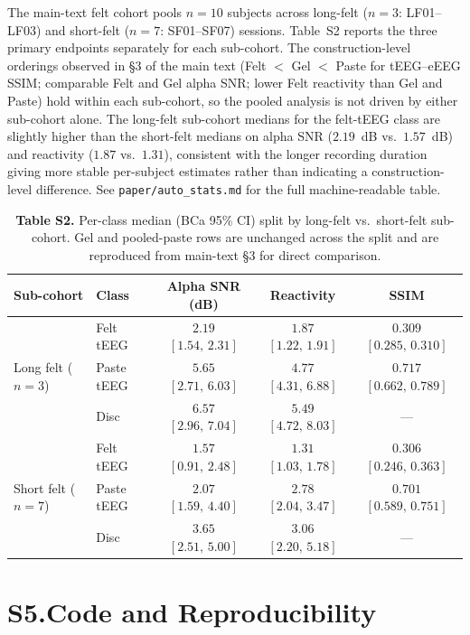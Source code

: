 \documentclass[10pt,a4paper]{article}
\begin{document}
The main-text felt cohort pools $n=10$ subjects across long-felt ($n=3$: LF01--LF03) and short-felt ($n=7$: SF01--SF07) sessions. Table~S2 reports the three primary endpoints separately for each sub-cohort. The construction-level orderings observed in §3 of the main text (Felt $<$ Gel $<$ Paste for tEEG--eEEG SSIM; comparable Felt and Gel alpha SNR; lower Felt reactivity than Gel and Paste) hold within each sub-cohort, so the pooled analysis is not driven by either sub-cohort alone. The long-felt sub-cohort medians for the felt-tEEG class are slightly higher than the short-felt medians on alpha SNR ($2.19$~dB vs.\ $1.57$~dB) and reactivity ($1.87$ vs.\ $1.31$), consistent with the longer recording duration giving more stable per-subject estimates rather than indicating a construction-level difference. See \texttt{paper/auto\_stats.md} for the full machine-readable table.

\begin{table}[H]
\caption*{\textbf{Table S2.} Per-class median (BCa 95\% CI) split by long-felt vs.\ short-felt sub-cohort. Gel and pooled-paste rows are unchanged across the split and are reproduced from main-text §3 for direct comparison.}
\centering\small
\begin{tabular}{llccc}
\toprule
\textbf{Sub-cohort} & \textbf{Class} & \textbf{Alpha SNR (dB)} & \textbf{Reactivity} & \textbf{SSIM} \\
\midrule
\multirow{3}{*}{Long felt ($n=3$)}
  & Felt tEEG  & $2.19$ $[1.54,\,2.31]$ & $1.87$ $[1.22,\,1.91]$ & $0.309$ $[0.285,\,0.310]$ \\
  & Paste tEEG & $5.65$ $[2.71,\,6.03]$ & $4.77$ $[4.31,\,6.88]$ & $0.717$ $[0.662,\,0.789]$ \\
  & Disc       & $6.57$ $[2.96,\,7.04]$ & $5.49$ $[4.72,\,8.03]$ & ---                       \\
\midrule
\multirow{3}{*}{Short felt ($n=7$)}
  & Felt tEEG  & $1.57$ $[0.91,\,2.48]$ & $1.31$ $[1.03,\,1.78]$ & $0.306$ $[0.246,\,0.363]$ \\
  & Paste tEEG & $2.07$ $[1.59,\,4.40]$ & $2.78$ $[2.04,\,3.47]$ & $0.701$ $[0.589,\,0.751]$ \\
  & Disc       & $3.65$ $[2.51,\,5.00]$ & $3.06$ $[2.20,\,5.18]$ & ---                       \\
\bottomrule
\end{tabular}
\end{table}

\section{S5.\quad Code and Reproducibility}\label{sec:s5}
\end{document}
